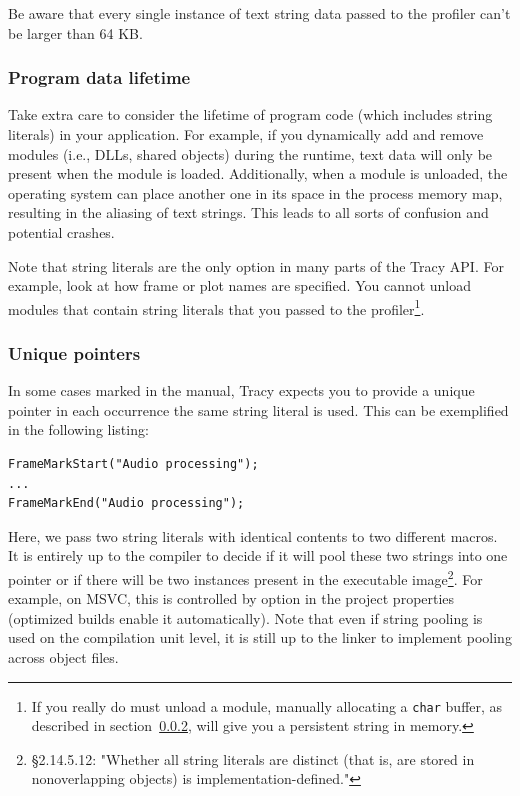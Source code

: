 \documentclass[hidelinks,titlepage,a4paper]{article}
\begin{document}
Be aware that every single instance of text string data passed to the profiler can't be larger than 64 KB.

\subsubsection{Program data lifetime}
\label{datalifetime}

Take extra care to consider the lifetime of program code (which includes string literals) in your application. For example, if you dynamically add and remove modules (i.e., DLLs, shared objects) during the runtime, text data will only be present when the module is loaded. Additionally, when a module is unloaded, the operating system can place another one in its space in the process memory map, resulting in the aliasing of text strings. This leads to all sorts of confusion and potential crashes.

Note that string literals are the only option in many parts of the Tracy API. For example, look at how frame or plot names are specified. You cannot unload modules that contain string literals that you passed to the profiler\footnote{If you really do must unload a module, manually allocating a \texttt{char} buffer, as described in section~\ref{uniquepointers}, will give you a persistent string in memory.}.

\subsubsection{Unique pointers}
\label{uniquepointers}

In some cases marked in the manual, Tracy expects you to provide a unique pointer in each occurrence the same string literal is used. This can be exemplified in the following listing:

\begin{lstlisting}
FrameMarkStart("Audio processing");
...
FrameMarkEnd("Audio processing");
\end{lstlisting}

Here, we pass two string literals with identical contents to two different macros. It is entirely up to the compiler to decide if it will pool these two strings into one pointer or if there will be two instances present in the executable image\footnote{\cite{ISO:2012:III} \S 2.14.5.12: "Whether all string literals are distinct (that is, are stored in nonoverlapping objects) is implementation-defined."}. For example, on MSVC, this is controlled by  option in the project properties (optimized builds enable it automatically). Note that even if string pooling is used on the compilation unit level, it is still up to the linker to implement pooling across object files.
\end{document}
